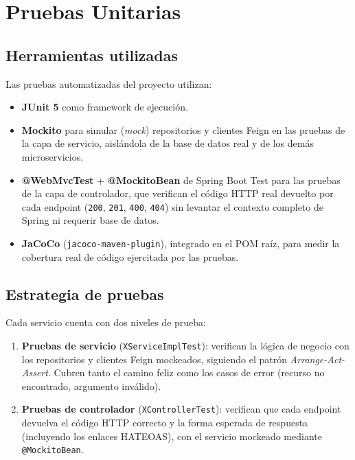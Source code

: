 \chapter{Pruebas Unitarias}
\label{ch:testing}

\section{Herramientas utilizadas}

Las pruebas automatizadas del proyecto utilizan:

\begin{itemize}
    \item \textbf{JUnit 5} como framework de ejecución.
    \item \textbf{Mockito} para simular (\textit{mock}) repositorios y clientes Feign
    en las pruebas de la capa de servicio, aislándola de la base de datos real y de
    los demás microservicios.
    \item \textbf{@WebMvcTest} + \textbf{@MockitoBean} de Spring Boot Test para las
    pruebas de la capa de controlador, que verifican el código HTTP real devuelto por
    cada endpoint (\texttt{200}, \texttt{201}, \texttt{400}, \texttt{404}) sin levantar
    el contexto completo de Spring ni requerir base de datos.
    \item \textbf{JaCoCo} (\texttt{jacoco-maven-plugin}), integrado en el POM raíz, para
    medir la cobertura real de código ejercitada por las pruebas.
\end{itemize}

\section{Estrategia de pruebas}

Cada servicio cuenta con dos niveles de prueba:

\begin{enumerate}
    \item \textbf{Pruebas de servicio} (\texttt{XServiceImplTest}): verifican la lógica
    de negocio con los repositorios y clientes Feign mockeados, siguiendo el patrón
    \textit{Arrange-Act-Assert}. Cubren tanto el camino feliz como los casos de error
    (recurso no encontrado, argumento inválido).
    \item \textbf{Pruebas de controlador} (\texttt{XControllerTest}): verifican que
    cada endpoint devuelva el código HTTP correcto y la forma esperada de respuesta
    (incluyendo los enlaces HATEOAS), con el servicio mockeado mediante
    \texttt{@MockitoBean}.
\end{enumerate}


